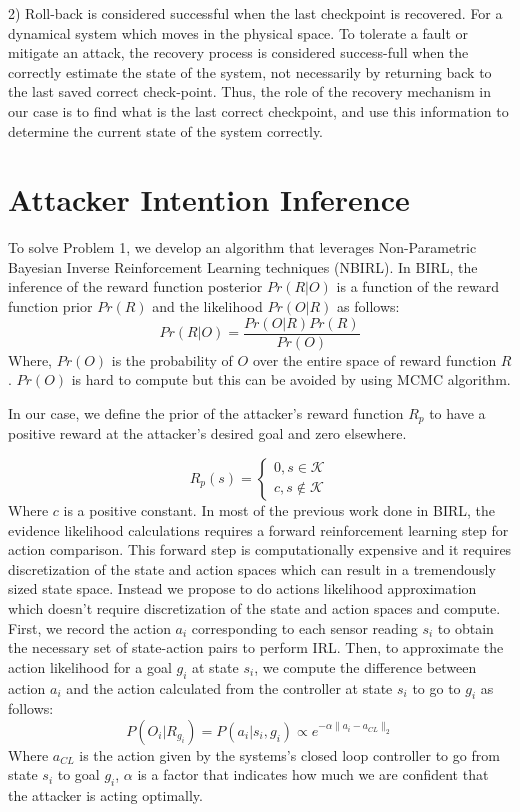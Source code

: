 \documentclass[conference]{IEEEtran}
\begin{document}
2) Roll-back is considered successful when the last checkpoint is recovered. For a dynamical system which moves in the physical space. To tolerate a fault or mitigate an attack, the recovery process is considered success-full when the correctly estimate the state of the system, not necessarily by returning back to the last saved correct check-point. Thus, the role of the recovery mechanism in our case is to find what is the last correct checkpoint, and use this information to determine the current state of the system correctly.

\section{Attacker Intention Inference}\label{sec:intpredic}
To solve Problem 1, we develop an algorithm that leverages Non-Parametric Bayesian Inverse Reinforcement Learning techniques (NBIRL). In BIRL, the inference of the reward function posterior $Pr(R|O)$ is a function of the reward function prior $Pr(R)$ and the likelihood $Pr(O|R)$ as follows:
\[ 
    Pr(R|O) = \frac{Pr(O|R)Pr(R)}{Pr(O)}
\]
Where, $Pr(O)$ is the probability of $O$ over the entire space of reward function $R$. $Pr(O)$ is hard to compute but this can be avoided by using MCMC algorithm.

In our case, we define the prior of the attacker's reward function $R_p$ to have a positive reward at the attacker's desired goal and zero elsewhere. 

  \[
    R_p(s)=\left\{
                \begin{array}{ll}
                  0, s\in \mathcal{K}\\
                  c, s\notin \mathcal{K}
                \end{array}
              \right.
  \]
Where $c$ is a positive constant.
In most of the previous work done in BIRL, the evidence likelihood calculations requires a forward reinforcement learning step for action comparison. This forward step is computationally expensive and it requires discretization of the state and action spaces which can result in a tremendously sized state space. Instead we propose to do actions likelihood approximation which doesn't require discretization of the state and action spaces and compute. First, we record the action $a_i$ corresponding to each sensor reading $s_i$ to obtain the necessary set of state-action pairs to perform IRL. Then, to approximate the action likelihood for a goal $g_i$ at state $s_i$, we compute the difference between action $a_i$ and the action calculated from the controller at state $s_i$ to go to $g_i$ as follows:
\[
P(O_i|R_{g_i}) = P(a_i|s_i,g_i) \propto e^{-\alpha \lVert a_i - a_{CL} \rVert_{2}}
\]
Where $a_{CL}$ is the action given by the systems's closed loop controller to go from state $s_i$ to goal $g_i$, $\alpha$ is a factor that indicates how much we are confident that the attacker is acting optimally.
\end{document}
